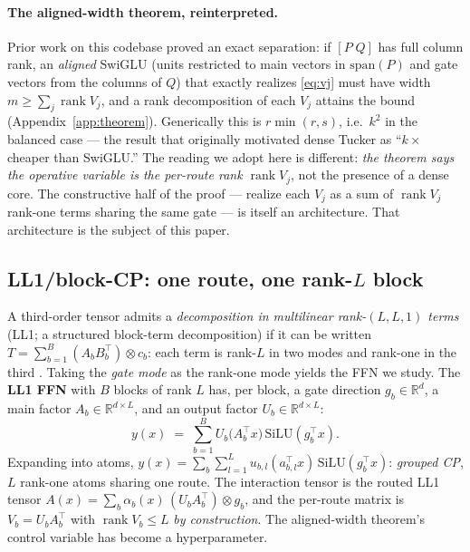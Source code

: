 \documentclass[11pt]{article}
\newcommand{\R}{\mathbb{R}}
\newcommand{\silu}{\mathrm{SiLU}}
\newcommand{\T}{^{\top}}
\DeclareMathOperator{\rank}{rank}
\begin{document}
\paragraph{The aligned-width theorem, reinterpreted.}
Prior work on this codebase proved an exact separation: if $[P\;Q]$ has full column
rank, an \emph{aligned} SwiGLU (units restricted to main vectors in $\mathrm{span}(P)$
and gate vectors from the columns of $Q$) that exactly realizes \eqref{eq:vj} must have
width $m \ge \sum_j \rank V_j$, and a rank decomposition of each $V_j$ attains the
bound (Appendix~\ref{app:theorem}). Generically this is $r\min(r,s)$, i.e.\ $k^2$ in
the balanced case --- the result that originally motivated dense Tucker as
``$k\times$ cheaper than SwiGLU.'' The reading we adopt here is different: \emph{the
theorem says the operative variable is the per-route rank $\rank V_j$}, not the
presence of a dense core. The constructive half of the proof --- realize each $V_j$ as
a sum of $\rank V_j$ rank-one terms sharing the same gate --- is itself an
architecture. That architecture is the subject of this paper.

\subsection{LL1/block-CP: one route, one rank-$L$ block}
\label{sec:ll1}

A third-order tensor admits a \emph{decomposition in multilinear rank-$(L,L,1)$ terms}
(LL1; a structured block-term decomposition) if it can be written
$T = \sum_{b=1}^{B} (A_b B_b\T) \otimes c_b$: each term is rank-$L$ in two modes and
rank-one in the third \citep{delathauwer2008blockterm,vervliet2016tensorlab}. Taking
the \emph{gate mode} as the rank-one mode yields the FFN we study. The
\textbf{LL1 FFN} with $B$ blocks of rank $L$ has, per block, a gate direction
$g_b \in \R^d$, a main factor $A_b \in \R^{d\times L}$, and an output factor
$U_b \in \R^{d \times L}$:
\begin{equation}
\label{eq:ll1}
y(x) \;=\; \sum_{b=1}^{B} U_b \big(A_b\T x\big)\, \silu(g_b\T x).
\end{equation}
Expanding into atoms, $y(x) = \sum_b \sum_{l=1}^{L} u_{b,l} (a_{b,l}\T x)\,
\silu(g_b\T x)$: \emph{grouped CP}, $L$ rank-one atoms sharing one route. The
interaction tensor is the routed LL1 tensor
$A(x) = \sum_b \alpha_b(x)\, (U_b A_b\T) \otimes g_b$, and the per-route matrix is
$V_b = U_b A_b\T$ with $\rank V_b \le L$ \emph{by construction}. The aligned-width
theorem's control variable has become a hyperparameter.
\end{document}
